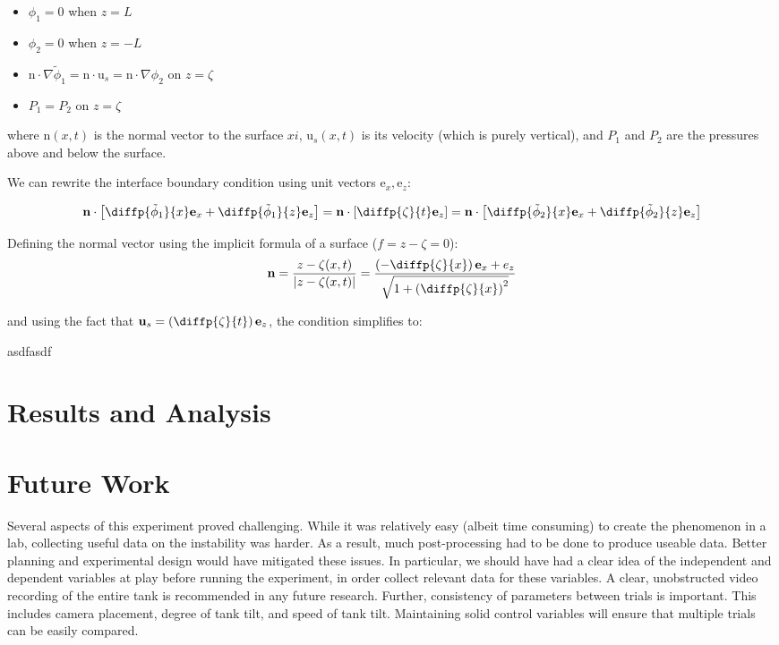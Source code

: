 \documentclass{article}
\renewcommand{\vec}[1]{\bm{\mathrm{#1}}}
\begin{document}
\begin{itemize}
    \item \(\phi_1 = 0\) when \(z = L\)
    \item \(\phi_2 = 0\) when \(z = -L\)
    \item \(\vec n \cdot \nabla \tilde \phi_1 = \vec n \cdot \vec u_s = \vec n \cdot \nabla \phi_2\) on \(z = \zeta\)
    \item \(P_1 = P_2\) on \(z = \zeta\)
\end{itemize}
where \(\vec n(x, t)\) is the normal vector to the surface \(xi\), \(\vec u_s(x,
t)\) is its velocity (which is purely vertical), and \(P_1\) and \(P_2\) are the pressures above and below
the surface.

We can rewrite the interface boundary condition using unit vectors \(\vec e_x, \vec e_z\):

\[ \vec n \cdot \left[ \diffp{\tilde \phi_1}{x} \vec e_x + \diffp{\tilde \phi_1}{z} \vec e_z\right] = \vec n \cdot \left[ \diffp{\zeta}{t} \vec e_z\right] = \vec n \cdot \left[\diffp{\tilde \phi_2}{x} \vec e_x + \diffp{\tilde \phi_2}{z} \vec e_z \right]\]

Defining the normal vector using the implicit formula of a surface (\(f = z - \zeta = 0\)):
\[\vec n = \frac{z - \zeta(x, t)}{|z - \zeta(x, t)|} = \frac{\left(-\diffp{\zeta}{x}\right)\vec e_x + e_z}{\sqrt{1 + \left(\diffp{\zeta}{x}\right)^2}}\]

and using the fact that \(\vec u_s = \left(\diffp{\zeta}{t}\right)\vec e_z\), the condition simplifies to:

asdfasdf

\section{Results and Analysis}

\section{Future Work}

Several aspects of this experiment proved challenging. While it was relatively
easy (albeit time consuming) to create the phenomenon in a lab, collecting
useful data on the instability was harder. As a result, much post-processing had
to be done to produce useable data. Better planning and experimental design
would have mitigated these issues. In particular, we should have had a clear
idea of the independent and dependent variables at play before running the
experiment, in order collect relevant data for these variables. A clear,
unobstructed video recording of the entire tank is recommended in any future
research. Further, consistency of parameters between trials is important. This
includes camera placement, degree of tank tilt, and speed of tank tilt.
Maintaining solid control variables will ensure that multiple trials can be
easily compared.

\newpage
{}

\end{document}
